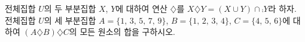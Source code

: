 전체집합 $U$의 두 부분집합 $X$, $Y$에 대하여 연산 $\diamondsuit$를 $X\diamondsuit Y=(X\cup Y)\cap\comp{Y}$라 하자. 전체집합 $U$의 세 부분집합 $A=\{1,\,3,\,5,\,7,\,9\}$, $B=\{1,\,2,\,3,\,4\}$, $C=\{4,\,5,\,6\}$에 대하여 $(A\diamondsuit B)\diamondsuit C$의 모든 원소의 합을 구하시오.
